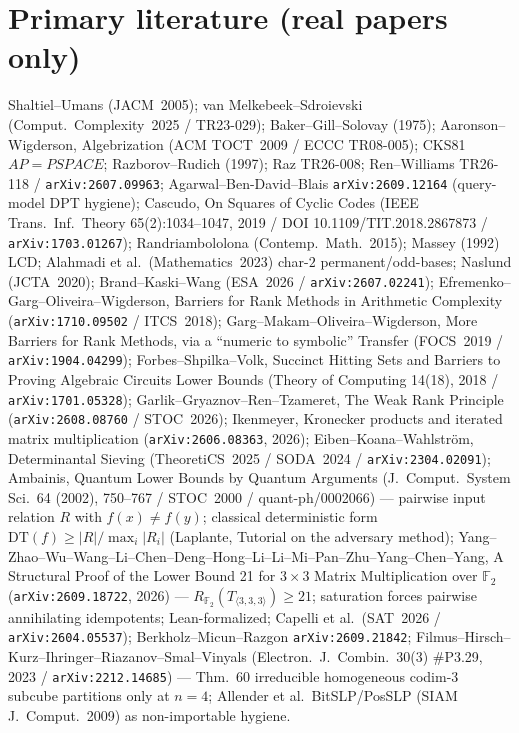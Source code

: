 \documentclass[11pt]{article}
\begin{document}
\section*{Primary literature (real papers only)}
Shaltiel--Umans (JACM~2005); van Melkebeek--Sdroievski (Comput.\ Complexity~2025 /
TR23-029); Baker--Gill--Solovay (1975); Aaronson--Wigderson, Algebrization
(ACM TOCT~2009 / ECCC TR08-005); CKS81 $AP=PSPACE$; Razborov--Rudich (1997);
Raz TR26-008; Ren--Williams TR26-118 / \texttt{arXiv:2607.09963};
Agarwal--Ben-David--Blais \texttt{arXiv:2609.12164} (query-model DPT hygiene);
Cascudo, On Squares of Cyclic Codes (IEEE Trans.\ Inf.\ Theory 65(2):1034--1047,
2019 / DOI 10.1109/TIT.2018.2867873 / \texttt{arXiv:1703.01267});
Randriambololona (Contemp.\ Math.\ 2015); Massey (1992) LCD;
Alahmadi et al.\ (Mathematics~2023) char-$2$ permanent/odd-bases;
Naslund (JCTA~2020); Brand--Kaski--Wang (ESA~2026 / \texttt{arXiv:2607.02241});
Efremenko--Garg--Oliveira--Wigderson, Barriers for Rank Methods in Arithmetic
Complexity (\texttt{arXiv:1710.09502} / ITCS~2018);
Garg--Makam--Oliveira--Wigderson, More Barriers for Rank Methods, via a
``numeric to symbolic'' Transfer (FOCS~2019 / \texttt{arXiv:1904.04299});
Forbes--Shpilka--Volk, Succinct Hitting Sets and Barriers to Proving Algebraic
Circuits Lower Bounds (Theory of Computing 14(18), 2018 /
\texttt{arXiv:1701.05328});
Garlik--Gryaznov--Ren--Tzameret, The Weak Rank Principle
(\texttt{arXiv:2608.08760} / STOC~2026);
Ikenmeyer, Kronecker products and iterated matrix multiplication
(\texttt{arXiv:2606.08363}, 2026);
Eiben--Koana--Wahlstr\"om, Determinantal Sieving (TheoretiCS~2025 / SODA~2024 /
\texttt{arXiv:2304.02091});
Ambainis, Quantum Lower Bounds by Quantum Arguments (J.\ Comput.\ System Sci.\ 64
(2002), 750--767 / STOC~2000 / quant-ph/0002066) --- pairwise input relation $R$
with $f(x)\neq f(y)$; classical deterministic form
$\mathrm{DT}(f)\ge |R|/\max_i|R_i|$ (Laplante, Tutorial on the adversary method);
Yang--Zhao--Wu--Wang--Li--Chen--Deng--Hong--Li--Li--Mi--Pan--Zhu--Yang--Chen--Yang,
A Structural Proof of the Lower Bound 21 for $3\times 3$ Matrix Multiplication
over $\mathbb F_2$ (\texttt{arXiv:2609.18722}, 2026) ---
$R_{\mathbb F_2}(T_{\langle 3,3,3\rangle})\ge 21$; saturation forces pairwise
annihilating idempotents; Lean-formalized;
Capelli et al.\ (SAT~2026 / \texttt{arXiv:2604.05537}); Berkholz--Micun--Razgon
\texttt{arXiv:2609.21842}; Filmus--Hirsch--Kurz--Ihringer--Riazanov--Smal--Vinyals
(Electron.\ J.\ Combin.\ 30(3) \#P3.29, 2023 / \texttt{arXiv:2212.14685}) ---
Thm.~60 irreducible homogeneous codim-3 subcube partitions only at $n=4$;
Allender et al.\ BitSLP/PosSLP (SIAM J.\ Comput.\ 2009) as non-importable hygiene.
\end{document}
